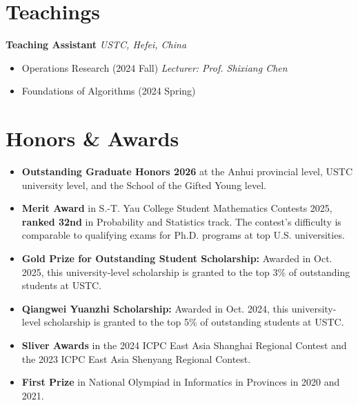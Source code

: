 \documentclass[a4paper,12pt]{ctexart}
\begin{document}
\section{\textbf{Teachings}}
\textbf{Teaching Assistant} \hfill \textit{USTC, Hefei, China}  \vspace{-0.1cm}
\begin{itemize}
    \item Operations Research (2024 Fall)  \hfill \textit{Lecturer: Prof. Shixiang Chen} \vspace{-0.25cm}
    \item Foundations of Algorithms (2024 Spring)  
\end{itemize}




\section{\textbf{Honors \& Awards}}
\begin{itemize}
    \item \textbf{Outstanding Graduate Honors 2026} at the Anhui provincial level, USTC university level, and the School of the Gifted Young level. \vspace{-0.25cm}
    
    \item \textbf{Merit Award} in S.-T. Yau College Student Mathematics Contests 2025, \textbf{ranked 32nd} in Probability and Statistics track. The contest's difficulty is comparable to qualifying exams for Ph.D. programs at top U.S. universities. \vspace{-0.25cm}
    
    \item \textbf{Gold Prize for Outstanding Student Scholarship:} Awarded in Oct. 2025, this university-level scholarship is granted to the top 3\% of outstanding students at USTC. \vspace{-0.25cm}
    
    \item \textbf{Qiangwei Yuanzhi Scholarship:} Awarded in Oct. 2024, this university-level scholarship is granted to the top 5\% of outstanding students at USTC. \vspace{-0.25cm}
    
    \item \textbf{Sliver Awards} in the 2024 ICPC East Asia Shanghai Regional Contest and the 2023 ICPC East Asia Shenyang Regional Contest. \vspace{-0.25cm}
    
    \item \textbf{First Prize} in National Olympiad in Informatics in Provinces in 2020 and 2021.
\end{itemize}
\end{document}
